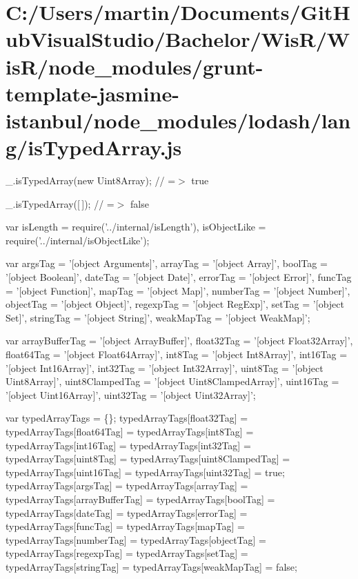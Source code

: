 \hypertarget{_c_1_2_users_2martin_2_documents_2_git_hub_visual_studio_2_bachelor_2_wis_r_2_wis_r_2node_module7c8874505a5beddb7db51dab316a2ac0}{}\section{C\+:/\+Users/martin/\+Documents/\+Git\+Hub\+Visual\+Studio/\+Bachelor/\+Wis\+R/\+Wis\+R/node\+\_\+modules/grunt-\/template-\/jasmine-\/istanbul/node\+\_\+modules/lodash/lang/is\+Typed\+Array.\+js}
\+\_\+.\+is\+Typed\+Array(new Uint8\+Array); // =$>$ true

\+\_\+.\+is\+Typed\+Array(\mbox{[}$\,$\mbox{]}); // =$>$ false


\begin{DoxyCodeInclude}
var isLength = require(\textcolor{stringliteral}{'../internal/isLength'}),
    isObjectLike = require(\textcolor{stringliteral}{'../internal/isObjectLike'});

var argsTag = \textcolor{stringliteral}{'[object Arguments]'},
    arrayTag = \textcolor{stringliteral}{'[object Array]'},
    boolTag = \textcolor{stringliteral}{'[object Boolean]'},
    dateTag = \textcolor{stringliteral}{'[object Date]'},
    errorTag = \textcolor{stringliteral}{'[object Error]'},
    funcTag = \textcolor{stringliteral}{'[object Function]'},
    mapTag = \textcolor{stringliteral}{'[object Map]'},
    numberTag = \textcolor{stringliteral}{'[object Number]'},
    objectTag = \textcolor{stringliteral}{'[object Object]'},
    regexpTag = \textcolor{stringliteral}{'[object RegExp]'},
    setTag = \textcolor{stringliteral}{'[object Set]'},
    stringTag = \textcolor{stringliteral}{'[object String]'},
    weakMapTag = \textcolor{stringliteral}{'[object WeakMap]'};

var arrayBufferTag = \textcolor{stringliteral}{'[object ArrayBuffer]'},
    float32Tag = \textcolor{stringliteral}{'[object Float32Array]'},
    float64Tag = \textcolor{stringliteral}{'[object Float64Array]'},
    int8Tag = \textcolor{stringliteral}{'[object Int8Array]'},
    int16Tag = \textcolor{stringliteral}{'[object Int16Array]'},
    int32Tag = \textcolor{stringliteral}{'[object Int32Array]'},
    uint8Tag = \textcolor{stringliteral}{'[object Uint8Array]'},
    uint8ClampedTag = \textcolor{stringliteral}{'[object Uint8ClampedArray]'},
    uint16Tag = \textcolor{stringliteral}{'[object Uint16Array]'},
    uint32Tag = \textcolor{stringliteral}{'[object Uint32Array]'};

var typedArrayTags = \{\};
typedArrayTags[float32Tag] = typedArrayTags[float64Tag] =
typedArrayTags[int8Tag] = typedArrayTags[int16Tag] =
typedArrayTags[int32Tag] = typedArrayTags[uint8Tag] =
typedArrayTags[uint8ClampedTag] = typedArrayTags[uint16Tag] =
typedArrayTags[uint32Tag] = \textcolor{keyword}{true};
typedArrayTags[argsTag] = typedArrayTags[arrayTag] =
typedArrayTags[arrayBufferTag] = typedArrayTags[boolTag] =
typedArrayTags[dateTag] = typedArrayTags[errorTag] =
typedArrayTags[funcTag] = typedArrayTags[mapTag] =
typedArrayTags[numberTag] = typedArrayTags[objectTag] =
typedArrayTags[regexpTag] = typedArrayTags[setTag] =
typedArrayTags[stringTag] = typedArrayTags[weakMapTag] = \textcolor{keyword}{false};


\end{DoxyCodeInclude}
